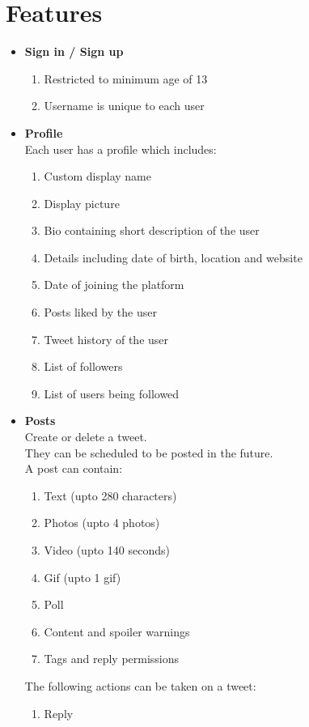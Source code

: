 \documentclass[journal,12pt, onecolumn]{IEEEtran}
\begin{document}
\section{Features} 
\begin{itemize}
\item \textbf{Sign in / Sign up} 
\begin{enumerate}
    \item Restricted to minimum age of 13 
    \item Username is unique to each user
\end{enumerate}
%
\item \textbf{Profile} \\
Each user has a profile which includes:
\begin{enumerate}
    \item Custom display name
    \item Display picture
    \item Bio containing short description of the user
    \item Details including date of birth, location and website
    \item Date of joining the platform
    \item Posts liked by the user
    \item Tweet history of the user
    \item List of followers
    \item List of users being followed
\end{enumerate}
%
\item \textbf{Posts}\\
Create or delete a tweet. \\
They can be scheduled to be posted in the future.  \\
A post can contain:
\begin{enumerate}
    \item Text (upto 280 characters)
    \item Photos (upto 4 photos)
    \item Video (upto 140 seconds)
    \item Gif (upto 1 gif)
    \item Poll
    \item Content and spoiler warnings
    \item Tags and reply permissions
\end{enumerate}
The following actions can be taken on a tweet:
\begin{enumerate}
    \item Reply 

\end{enumerate}
\end{itemize}
\end{document}
